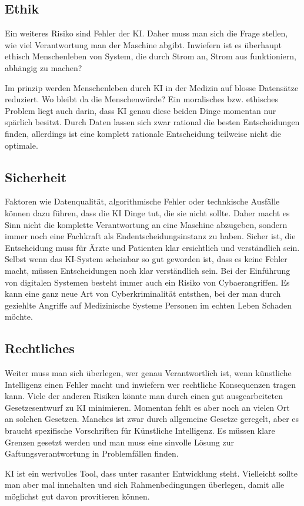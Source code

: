 \subsection{\normalsize{Ethik}}
Ein weiteres Risiko sind Fehler der KI. Daher muss man sich die Frage stellen, wie viel Verantwortung man der Maschine abgibt.
Inwiefern ist es überhaupt ethisch Menschenleben von System, die durch Strom an, Strom aus funktioniern, abhängig zu machen?

Im prinzip werden Menschenleben durch KI in der Medizin auf blosse Datensätze reduziert. Wo bleibt da die Menschenwürde?
Ein moralisches bzw. ethisches Problem liegt auch darin, dass KI genau diese beiden Dinge momentan nur spärlich besitzt. 
Durch Daten lassen sich zwar rational  die besten Entscheidungen finden, allerdings ist eine komplett rationale Entscheidung teilweise nicht die optimale.

\subsection{\normalsize{Sicherheit}}
Faktoren wie Datenqualität, algorithmische Fehler oder technkische Ausfälle können dazu führen, dass die KI Dinge tut, die sie nicht sollte. 
Daher macht es Sinn nicht die komplette Verantwortung an eine Maschine abzugeben, sondern immer noch eine Fachkraft als Endentscheidungsinstanz zu haben.
Sicher ist, die Entscheidung muss für Ärzte und Patienten klar ersichtlich und verständlich sein. Selbst wenn das KI-System scheinbar so gut geworden ist, dass es keine Fehler macht, 
müssen Entscheidungen noch klar verständlich sein. Bei der Einführung von digitalen Systemen besteht immer auch ein  Risiko von Cybaerangriffen.
Es kann eine ganz neue Art von Cyberkriminalität entsthen, bei der man durch geziehlte Angriffe auf Medizinische Systeme Personen im echten Leben Schaden möchte.

\subsection{\normalsize{Rechtliches}}
Weiter muss man sich überlegen, wer genau Verantwortlich ist, wenn künstliche Intelligenz einen Fehler macht und inwiefern wer rechtliche Konsequenzen tragen kann.
Viele der anderen Risiken könnte man durch einen gut ausgearbeiteten Gesetzesentwurf zu KI minimieren. 
Momentan fehlt es aber noch an vielen Ort an solchen Gesetzen. Manches ist zwar durch allgemeine Gesetze geregelt, aber es braucht spezifische Vorschriften für Künstliche Intelligenz.
Es müssen klare Grenzen gesetzt werden und man muss eine sinvolle Lösung zur Gaftungsverantwortung in Problemfällen finden.

KI ist ein wertvolles Tool, dass unter rasanter Entwicklung steht. Vielleicht sollte man aber mal innehalten und sich Rahmenbedingungen überlegen, damit alle möglichst gut davon provitieren können.